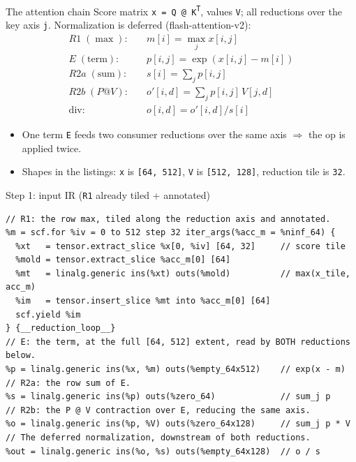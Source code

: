 \documentclass[10pt, aspectratio=169]{beamer}
\newcommand{\code}[1]{\texttt{\small #1}}
\begin{document}
\begin{frame}{The attention chain}
  Score matrix \code{x = Q @ K\textsuperscript{T}}, values \code{V}; all
  reductions over the key axis \code{j}. Normalization is deferred
  (flash-attention-v2):
  \vspace{1mm}
  \[
  \begin{aligned}
    R1 \;(\max):&\quad m[i]    = \max_j x[i,j] \\
    E \;(\text{term}):&\quad p[i,j]  = \exp(x[i,j] - m[i]) \\
    R2a \;(\text{sum}):&\quad s[i]    = \textstyle\sum_j p[i,j] \\
    R2b \;(P@V):&\quad o'[i,d] = \textstyle\sum_j p[i,j]\, V[j,d] \\
    \text{div}:&\quad o[i,d]  = o'[i,d] / s[i]
  \end{aligned}
  \]
  \vspace{1mm}
  \begin{itemize}\small
    \item One term \code{E} feeds \alert{two} consumer reductions over the same
      axis $\Rightarrow$ the op is applied \alert{twice}.
    \item Shapes in the listings: \code{x} is \code{[64, 512]}, \code{V} is
      \code{[512, 128]}, reduction tile is \code{32}.
  \end{itemize}
\end{frame}

\begin{frame}[fragile]{Step 1: input IR (\code{R1} already tiled + annotated)}
\begin{lstlisting}
// R1: the row max, tiled along the reduction axis and annotated.
%m = scf.for %iv = 0 to 512 step 32 iter_args(%acc_m = %ninf_64) {
  %xt   = tensor.extract_slice %x[0, %iv] [64, 32]     // score tile
  %mold = tensor.extract_slice %acc_m[0] [64]
  %mt   = linalg.generic ins(%xt) outs(%mold)          // max(x_tile, acc_m)
  %im   = tensor.insert_slice %mt into %acc_m[0] [64]
  scf.yield %im
} {__reduction_loop__}
// E: the term, at the full [64, 512] extent, read by BOTH reductions below.
%p = linalg.generic ins(%x, %m) outs(%empty_64x512)    // exp(x - m)
// R2a: the row sum of E.
%s = linalg.generic ins(%p) outs(%zero_64)             // sum_j p
// R2b: the P @ V contraction over E, reducing the same axis.
%o = linalg.generic ins(%p, %V) outs(%zero_64x128)     // sum_j p * V
// The deferred normalization, downstream of both reductions.
%out = linalg.generic ins(%o, %s) outs(%empty_64x128)  // o / s
\end{lstlisting}
\end{frame}
\end{document}

